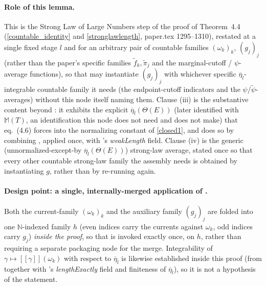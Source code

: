 \begin{lemma}
  \paragraph{Role of this lemma.} This is the Strong Law of Large Numbers step of the proof of
  Theorem~4.4 (\eqref{countable_identity} and \eqref{stronglawlength}, paper.tex 1295--1310),
  restated at a single fixed stage $l$ and for an arbitrary pair of countable families
  $(\omega_k)_k$, $(g_j)_j$ (rather than the paper's specific families $\tilde f_k, \tilde\pi_j$
  and the marginal-cutoff / $\psi$-average functions), so that  may
  instantiate $(g_j)_j$ with whichever specific $\overline\eta_l$-integrable countable family it
  needs (the endpoint-cutoff indicators and the $\psi$/$\tilde\psi$-averages) without this node
  itself naming them. Clause (iii) is the substantive content beyond
  : it exhibits the explicit
  $\overline{\eta}_l(\Theta(E))$ (later identified with $\mathbb{M}(T)$, an identification this
  node does not need and does not make) that eq.~(4.6) forces into the normalizing constant of
  \eqref{closed1}, and does so by combining , applied once, with
  's \emph{weakLength} field. Clause (iv) is the generic (unnormalized-except-by
  $\overline\eta_l(\Theta(E))$) strong-law average, stated once so that every other countable
  strong-law family the assembly needs is obtained by instantiating $g$, rather than by re-running
   again.

  \paragraph{Design point: a single, internally-merged application of
  .} Both the current-family $(\omega_k)_k$ and the auxiliary
  family $(g_j)_j$ are folded into one $\mathbb{N}$-indexed family $h$ (even indices carry the
  currents against $\omega_k$, odd indices carry $g_j$) \emph{inside the proof}, so that
   is invoked exactly once, on $h$, rather than requiring a
  separate packaging node for the merge. Integrability of $\gamma \mapsto [[\gamma]](\omega_k)$
  with respect to $\overline\eta_l$ is likewise established inside this proof (from
   together with 's \emph{lengthExactly} field and
  finiteness of $\overline\eta_l$), so it is not a hypothesis of the statement.


\end{lemma}
